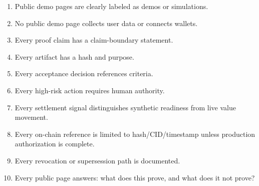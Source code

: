 \begin{enumerate}
  \item Public demo pages are clearly labeled as demos or simulations.
  \item No public demo page collects user data or connects wallets.
  \item Every proof claim has a claim-boundary statement.
  \item Every artifact has a hash and purpose.
  \item Every acceptance decision references criteria.
  \item Every high-risk action requires human authority.
  \item Every settlement signal distinguishes synthetic readiness from live value movement.
  \item Every on-chain reference is limited to hash/CID/timestamp unless production authorization is complete.
  \item Every revocation or supersession path is documented.
  \item Every public page answers: what does this prove, and what does it not prove?
\end{enumerate}

\newpage
\printbibliography


